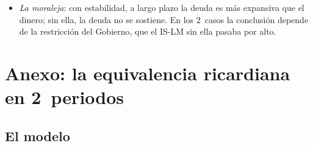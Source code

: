 \documentclass[11pt]{article}
\begin{document}
\begin{itemize}
\item \emph{La moraleja}: con estabilidad, a largo plazo la deuda es más expansiva que el dinero; sin ella, la deuda no se sostiene. En los 2~casos la conclusión depende de la restricción del Gobierno, que el IS-LM sin ella pasaba por alto.\findemo
\end{itemize}

\section{Anexo: la equivalencia ricardiana en 2~periodos}\label{anexo:ricardiana-dos-periodos}

\subsection{El modelo}
\end{document}
